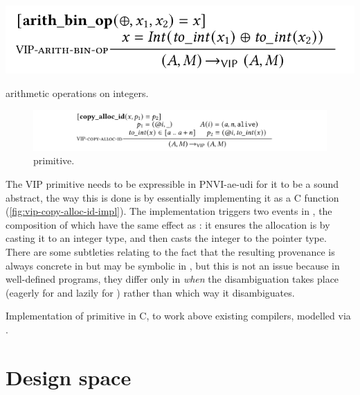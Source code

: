 \begin{marginfigure}
    \includegraphics{figures/mem-model-vip-arith-binop}
    \caption{ arithmetic operations on integers.}\label{fig:vip-arith-binop}
\end{marginfigure}

\begin{figure}[tp]
    \includegraphics{figures/mem-model-vip-copy-alloc-id}
    \caption{  primitive.}\label{fig:vip-copy-alloc-id}
\end{figure}

The VIP  primitive needs to be expressible in
PNVI-ae-udi for it to be a sound abstract, the way this is done is by
essentially implementing it as a C function
(\cref{fig:vip-copy-alloc-id-impl}). The implementation triggers two events in
, the composition of which have the same effect as
: it ensures the allocation is  by casting
it to an integer type, and then casts the integer to the pointer type. There
are some subtleties relating to the fact that the resulting provenance is
always concrete in  but may be symbolic in , but this
is not an issue because in well-defined programs, they differ only in
\emph{when} the disambiguation takes place (eagerly for  and lazily for
) rather than which way it disambiguates.

\begin{marginfigure}
    \caption{Implementation of   primitive in C, to
        work above existing compilers, modelled via
        .}\label{fig:vip-copy-alloc-id-impl}
\end{marginfigure}


\section{Design space}

